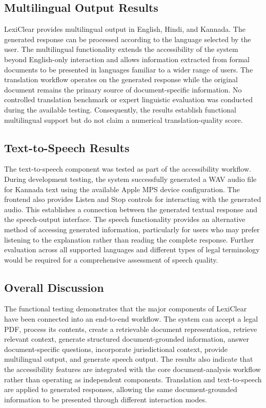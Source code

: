 \documentclass[12pt,a4paper,oneside]{report}
\begin{document}
\subsection{Multilingual Output Results}
LexiClear provides multilingual output in English, Hindi, and Kannada. The generated response can be processed according to the language selected by the user. The multilingual functionality extends the accessibility of the system beyond English-only interaction and allows information extracted from formal documents to be presented in languages familiar to a wider range of users. The translation workflow operates on the generated response while the original document remains the primary source of document-specific information. No controlled translation benchmark or expert linguistic evaluation was conducted during the available testing. Consequently, the results establish functional multilingual support but do not claim a numerical translation-quality score.

\subsection{Text-to-Speech Results}
The text-to-speech component was tested as part of the accessibility workflow. During development testing, the system successfully generated a WAV audio file for Kannada text using the available Apple MPS device configuration. The frontend also provides Listen and Stop controls for interacting with the generated audio. This establishes a connection between the generated textual response and the speech-output interface. The speech functionality provides an alternative method of accessing generated information, particularly for users who may prefer listening to the explanation rather than reading the complete response. Further evaluation across all supported languages and different types of legal terminology would be required for a comprehensive assessment of speech quality.
\subsection{Overall Discussion}
The functional testing demonstrates that the major components of LexiClear have been connected into an end-to-end workflow. The system can accept a legal PDF, process its contents, create a retrievable document representation, retrieve relevant context, generate structured document-grounded information, answer document-specific questions, incorporate jurisdictional context, provide multilingual output, and generate speech output. The results also indicate that the accessibility features are integrated with the core document-analysis workflow rather than operating as independent components. Translation and text-to-speech are applied to generated responses, allowing the same document-grounded information to be presented through different interaction modes.
\end{document}
